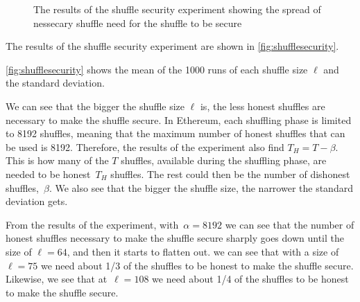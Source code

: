 \begin{figure}[!htb]
    \centering
    \caption{The results of the shuffle security experiment showing the spread of nessecary shuffle need for the shuffle to be secure}%
    \label{fig:shufflesecurityviolin}%
\end{figure}

The results of the shuffle security experiment are shown in \autoref{fig:shufflesecurity}.

\autoref{fig:shufflesecurity} shows the mean of the 1000 runs of each shuffle size $\ell$ and the standard deviation.

We can see that the bigger the shuffle size $\ell$ is, the less honest shuffles are necessary to make the shuffle secure.
In Ethereum, each shuffling phase is limited to 8192 shuffles, meaning that the maximum number of honest shuffles that can be used is 8192.
Therefore, the results of the experiment also find $T_H=T-\beta$.
This is how many of the $T$ shuffles, available during the shuffling phase, are needed to be honest~$T_H$ shuffles.
The rest could then be the number of dishonest shuffles,~$\beta$.
We also see that the bigger the shuffle size, the narrower the standard deviation gets.

From the results of the experiment, with~$\alpha=8192$ we can see that the number of honest shuffles necessary to make the shuffle secure sharply goes down until the size of $\ell=64$, and then it starts to flatten out.
we can see that with a size of $\ell=75$ we need about 1/3 of the shuffles to be honest to make the shuffle secure.
Likewise, we see that at~$\ell=108$ we need about 1/4 of the shuffles to be honest to make the shuffle secure.

